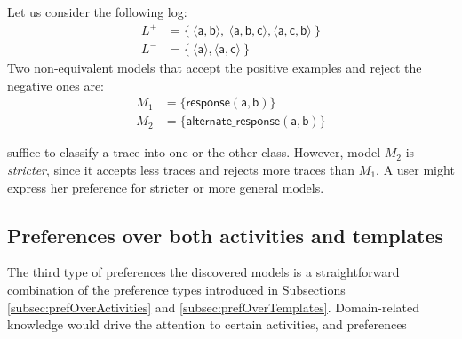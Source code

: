 \begin{example}
\label{ex:alternateVsResponse}
Let us consider the following log:
\begin{align*}
L^+ & = \{\ \langle \mathsf{a}, \mathsf{b} \rangle,\ \langle \mathsf{a}, \mathsf{b}, \mathsf{c} \rangle, \langle \mathsf{a}, \mathsf{c}, \mathsf{b} \rangle \ \} \\
L^- & = \{\ \langle \mathsf{a} \rangle, \langle \mathsf{a}, \mathsf{c} \rangle \ \}
\end{align*}
%
Two non-equivalent models that accept the positive examples and reject the negative ones are:
\begin{align*}
M_1 & = \{ \mathsf{response(a,b)}\} \\
M_2 & = \{ \mathsf{alternate\_response(a, b)}\} \tag*{$\square$}
\end{align*}
\end{example}

suffice to classify a trace into one or the other class. However, model $M_2$ %
is \emph{stricter}, since it accepts less traces and rejects more traces than $M_1$. %
A user might express her preference for stricter or more general models.


\subsection{Preferences over both activities and templates}
\label{sub:prefOverBoth}

The third type of preferences  the discovered models is a straightforward combination of the preference types introduced in Subsections \ref{subsec:prefOverActivities} and \ref{subsec:prefOverTemplates}. Domain-related knowledge would drive the attention to certain activities, and preferences %


